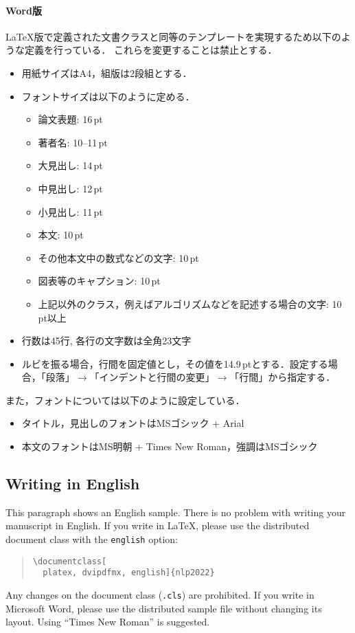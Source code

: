 \documentclass[
  platex, dvipdfmx,  %
]{nlp2024}
\newcommand{\code}[1]{\texttt{#1}}
\begin{document}
\paragraph{Word版}
LaTeX版で定義された文書クラスと同等のテンプレートを実現するため以下のような定義を行っている．
これらを変更することは禁止とする．
\begin{itemize}
    \item 用紙サイズはA4，組版は2段組とする．
    \item フォントサイズは以下のように定める．
    \begin{itemize}
        \item 論文表題: 16\,pt
        \item 著者名: 10--11\,pt
        \item 大見出し: 14\,pt
        \item 中見出し: 12\,pt
        \item 小見出し: 11\,pt
        \item 本文: 10\,pt
        \item その他本文中の数式などの文字: 10\,pt
        \item 図表等のキャプション: 10\,pt
        \item 上記以外のクラス，例えばアルゴリズムなどを記述する場合の文字: 10\,pt以上
    \end{itemize}
    \item 行数は45行, 各行の文字数は全角23文字
    \item ルビを振る場合，行間を固定値とし，その値を14.9\,ptとする．設定する場合，「段落」$\xrightarrow{}$「インデントと行間の変更」$\xrightarrow{}$「行間」から指定する．
\end{itemize}
また，フォントについては以下のように設定している．
\begin{itemize}
\item タイトル，見出しのフォントはMSゴシック + Arial
\item 本文のフォントはMS明朝 + Times New Roman，強調はMSゴシック
\end{itemize}


\subsection{Writing in English}
This paragraph shows an English sample.
There is no problem with writing your manuscript in English.
If you write in LaTeX, please use the distributed document class with the \code{english} option:
\begin{quote}
\verb|\documentclass[|\\
\verb|  platex, dvipdfmx, english]{nlp2022}|
\end{quote}
Any changes on the document class (\code{.cls}) are prohibited.
If you write in Microsoft Word, please use the distributed sample file without changing its layout.
Using ``Times New Roman'' is suggested.
\end{document}
